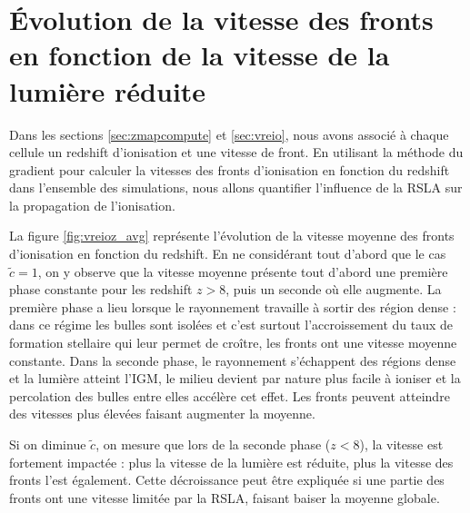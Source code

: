 


\section{Évolution de la vitesse des fronts en fonction de la vitesse de la lumière réduite}
\label{sec:compfrontspeep}

Dans les sections \ref{sec:zmapcompute} et \ref{sec:vreio}, nous avons associé à chaque cellule un redshift d'ionisation et une vitesse de front.
En utilisant la méthode du gradient pour calculer la vitesses des fronts d'ionisation en fonction du redshift dans l'ensemble des simulations, nous allons quantifier l'influence de la \ac{RSLA} sur la propagation de l'ionisation.


La figure \ref{fig:vreioz_avg} représente l'évolution de la vitesse moyenne des fronts d'ionisation en fonction du redshift.
En ne considérant tout d'abord que le cas  $\tilde{c}=1$, on y observe que la vitesse moyenne présente tout d'abord une première phase constante pour les redshift $z>8$, puis un seconde où elle augmente.
La première phase a lieu lorsque le rayonnement travaille à sortir des région dense : dans ce régime les bulles sont isolées et c'est surtout l'accroissement du taux de formation stellaire qui leur permet de croître, les fronts ont une vitesse moyenne constante.
Dans la seconde phase, le rayonnement s'échappent des régions dense et la lumière atteint l'\ac{IGM}, le milieu devient par nature plus facile à ioniser et la percolation des bulles entre elles accélère cet effet.
Les fronts peuvent atteindre des vitesses plus élevées faisant augmenter la moyenne.

Si on diminue $\tilde{c}$, on mesure que lors de la seconde phase ($z<8$), la vitesse est fortement impactée : plus la vitesse de la lumière est réduite, plus la vitesse des fronts l'est également.
Cette décroissance peut être expliquée si une partie des fronts ont une vitesse limitée par la \ac{RSLA}, faisant baiser la moyenne globale.

